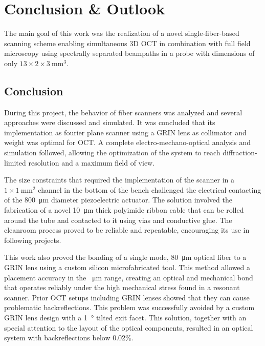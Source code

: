 %
\chapter{Conclusion \& Outlook}

The main goal of this work was the realization of a novel single-fiber-based scanning scheme enabling simultaneous 3D OCT in combination with full field microscopy using spectrally separated beampaths in a probe with dimensions of only $13 \times 2 \times \SI{3}{\milli\meter^3}$. 

\section{Conclusion}
During this project, the behavior of fiber scanners was analyzed and several approaches were discussed and simulated. It was concluded that its implementation as fourier plane scanner using a GRIN lens as collimator and weight was optimal for OCT. A complete electro-mechano-optical analysis and simulation followed, allowing the optimization of the system to reach diffraction-limited resolution and a maximum field of view.

The size constraints that required the implementation of the scanner in a $1\times \SI{1}{\milli\meter^2}$ channel in the bottom of the bench challenged the electrical contacting of the \SI{800}{\micro\meter} diameter piezoelectric actuator. The solution involved the fabrication of a novel \SI{10}{\micro\meter} thick polyimide ribbon cable that can be rolled around the tube and contacted to it using vias and conductive glue. The cleanroom process proved to be reliable and repeatable, encouraging its use in following projects.

This work also proved the bonding of a single mode, \SI{80}{\micro\meter} optical fiber to a GRIN lens using a custom silicon microfabricated tool. This method allowed a placement accuracy in the \SI{}{\micro\meter} range, creating an optical and mechanical bond that operates reliably under the high mechanical stress found in a resonant scanner. Prior OCT setups including GRIN lenses showed that they can cause problematic backreflections. This problem was successfully avoided by a custom GRIN lens design with a \SI{1}{\degree} tilted exit facet. This solution, together with an special attention to the layout of the optical components, resulted in an optical system with backreflections below 0.02\%.

